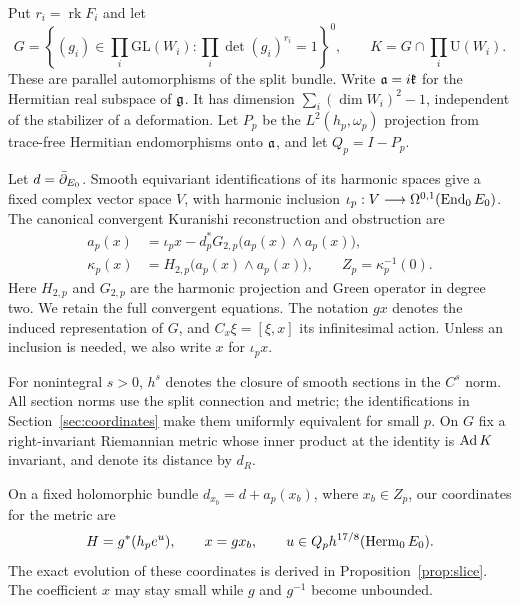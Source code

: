 Put $r_i=\operatorname{rk}F_i$ and let
\begin{equation}\label{eq:group}
 G=\left\{(g_i)\in\prod_i\mathrm{GL}(W_i):
                  \prod_i\det(g_i)^{r_i}=1\right\}^{0},
 \qquad K=G\cap\prod_i\mathrm U(W_i).
\end{equation}
These are parallel automorphisms of the split bundle.
Write $\mathfrak a=i\mathfrak k$ for the Hermitian real subspace of $\mathfrak g$.
It has dimension $\sum_i(\dim W_i)^2-1$, independent of the
stabilizer of a deformation. Let $P_p$ be the $L^2(h_p,\omega_p)$
projection from trace-free Hermitian endomorphisms onto $\mathfrak a$, and
let $Q_p=I-P_p$.

Let $d=\bar\partial_{E_0}$. Smooth equivariant identifications of its harmonic
spaces give a fixed complex vector space $V$, with harmonic inclusion
$\iota_p:V\longrightarrow\Omega^{0,1}(\operatorname{End}_0E_0)$.
The canonical convergent Kuranishi reconstruction and obstruction are
\begin{equation}\label{eq:kuranishi}
 \begin{split}
 a_p(x)&=\iota_p x-d_p^*G_{2,p}\bigl(a_p(x)\wedge a_p(x)\bigr),\\
 \kappa_p(x)&=H_{2,p}\bigl(a_p(x)\wedge a_p(x)\bigr),\qquad
 Z_p=\kappa_p^{-1}(0).
 \end{split}
\end{equation}
Here $H_{2,p}$ and $G_{2,p}$ are the harmonic projection and Green
operator in degree two. We retain the full convergent equations.
The notation $gx$ denotes the induced representation of $G$, and
$C_x\xi=[\xi,x]$ its infinitesimal action. Unless an inclusion is needed,
we also write $x$ for $\iota_p x$.

For nonintegral $s>0$, $h^s$ denotes the closure of smooth sections in
the $C^s$ norm. All section norms use the split connection and metric;
the identifications in Section~\ref{sec:coordinates} make them uniformly
equivalent for small $p$. On $G$ fix a right-invariant Riemannian metric
whose inner product at the identity is $\operatorname{Ad} K$ invariant, and denote its
distance by $d_R$.

On a fixed holomorphic bundle $d_{x_b}=d+a_p(x_b)$, where $x_b\in Z_p$,
our coordinates for the metric are
\begin{equation}\label{eq:metric-coordinates}
 H=g^*(h_p e^u),\qquad x=gx_b,\qquad
 u\in Q_p h^{17/8}(\operatorname{Herm}_0E_0).
\end{equation}
The exact evolution of these coordinates is derived in
Proposition~\ref{prop:slice}. The coefficient $x$ may stay small while
$g$ and $g^{-1}$ become unbounded.

